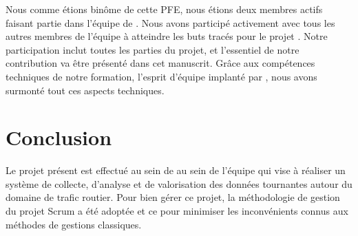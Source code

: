 Nous comme étions binôme de cette PFE, nous étions deux membres actifs faisant partie dans l'équipe de
.
Nous avons participé activement avec tous les autres membres de l'équipe à atteindre les buts
tracés pour le projet .
Notre participation inclut toutes les parties du projet, et l'essentiel de notre contribution va
être présenté dans cet manuscrit.
Grâce aux compétences techniques de notre formation, l'esprit d'équipe implanté par ,
nous avons surmonté tout ces aspects techniques.

\section*{Conclusion}

Le projet présent est effectué au sein de  au sein
de l'équipe  qui vise à réaliser un système de collecte,
d'analyse et de valorisation des données tournantes autour du domaine de trafic
routier. Pour bien gérer ce projet, la méthodologie de gestion du projet Scrum
a été adoptée et ce pour minimiser les inconvénients connus aux méthodes de
gestions classiques.


